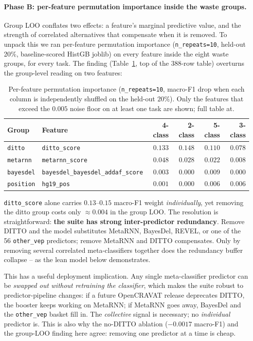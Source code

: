\documentclass[11pt,a4paper]{article}
\begin{document}
\paragraph{Phase B: per-feature permutation importance inside the waste groups.}
Group LOO conflates two effects: a feature's marginal predictive value,
and the strength of correlated alternatives that compensate when it is
removed. To unpack this we ran per-feature permutation importance
(\texttt{n\_repeats=10}, held-out 20\%, baseline-scored HistGB joblib)
on every feature inside the eight waste groups, for every task. The
finding (Table~\ref{tab:ablation-perfeat}, top of the $388$-row table)
overturns the group-level reading on two features:

\begin{table}[H]
\centering
\caption{Per-feature permutation importance (\texttt{n\_repeats=10},
macro-F1 drop when each column is independently shuffled on the held-out
$20\%$). Only the features that exceed the $0.005$ noise floor on at
least one task are shown; full table at.}
\label{tab:ablation-perfeat}
\small
\begin{tabular}{llrrrr}
\toprule
Group & Feature & 4-class & 2-class & 5-class & 3-class \\
\midrule
\texttt{ditto} & \texttt{ditto\_score} & $0.133$ & $0.148$ & $0.110$ & $0.078$ \\
\texttt{metarnn} & \texttt{metarnn\_score} & $0.048$ & $0.028$ & $0.022$ & $0.008$ \\
\texttt{bayesdel} & \texttt{bayesdel\_bayesdel\_addaf\_score}& $0.003$ & $0.000$ & $0.009$ & $0.000$ \\
\texttt{position} & \texttt{hg19\_pos} & $0.001$ & $0.000$ & $0.006$ & $0.006$ \\
\bottomrule
\end{tabular}
\end{table}

\texttt{ditto\_score} alone carries $0.13$--$0.15$ macro-F1 weight
\emph{individually}, yet removing the ditto group costs only
$\approx 0.004$ in the group LOO. The resolution is straightforward:
\textbf{the suite has strong inter-predictor redundancy}. Remove DITTO and
the model substitutes MetaRNN, BayesDel, REVEL, or one of the 56
\texttt{other\_vep} predictors; remove MetaRNN and DITTO compensates.
Only by removing several correlated meta-classifiers together does the
redundancy buffer collapse -- as the lean model below demonstrates.

This has a useful deployment implication. Any single meta-classifier
predictor can be \emph{swapped out without retraining the classifier},
which makes the suite robust to predictor-pipeline changes: if a future
OpenCRAVAT release deprecates DITTO, the booster keeps working on
MetaRNN; if MetaRNN goes away, BayesDel and the \texttt{other\_vep}
basket fill in. The \emph{collective} signal is necessary; no
\emph{individual} predictor is. This is also why the no-DITTO ablation
($-0.0017$ macro-F1) and the group-LOO finding here
agree: removing one predictor at a time is cheap.
\end{document}
